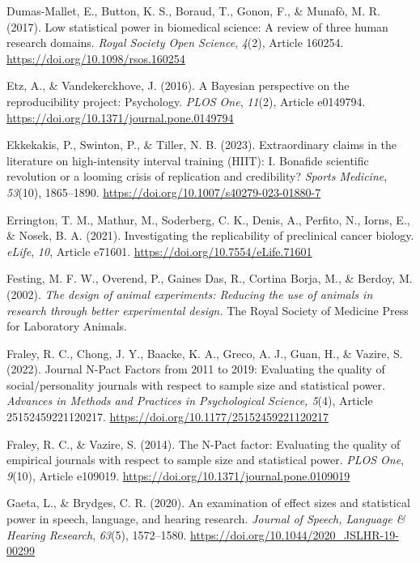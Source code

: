\documentclass[authordate, meta, issue]{jote-new-article}
\begin{document}
	Dumas-Mallet, E., Button, K. S., Boraud, T., Gonon, F., \& Munafò, M. R. (2017). Low statistical power in biomedical science: A review of three human research domains. \emph{Royal Society Open Science}, \emph{4}(2), Article 160254. \url{https://doi.org/10.1098/rsos.160254}



	Etz, A., \& Vandekerckhove, J. (2016). A Bayesian perspective on the reproducibility project: Psychology. \emph{PLOS One}, \emph{11}(2), Article e0149794. \url{https://doi.org/10.1371/journal.pone.0149794}



	Ekkekakis, P., Swinton, P., \& Tiller, N. B. (2023). Extraordinary claims in the literature on high-intensity interval training (HIIT): I. Bonafide scientific revolution or a looming crisis of replication and credibility? \emph{Sports Medicine}, \emph{53}(10), 1865--1890. \url{https://doi.org/10.1007/s40279-023-01880-7}



	Errington, T. M., Mathur, M., Soderberg, C. K., Denis, A., Perfito, N., Iorns, E., \& Nosek, B. A. (2021). Investigating the replicability of preclinical cancer biology. \emph{eLife}, \emph{10}, Article e71601. \url{https://doi.org/10.7554/eLife.71601}



	Festing, M. F. W., Overend, P., Gaines Das, R., Cortina Borja, M., \& Berdoy, M. (2002). \emph{The design of animal experiments: Reducing the use of animals in research through better experimental design.} The Royal Society of Medicine Press for Laboratory Animals.



	Fraley, R. C., Chong, J. Y., Baacke, K. A., Greco, A. J., Guan, H., \& Vazire, S. (2022). Journal N-Pact Factors from 2011 to 2019: Evaluating the quality of social/personality journals with respect to sample size and statistical power. \emph{Advances in Methods and Practices in Psychological Science, 5}(4), Article 25152459221120217. \url{https://doi.org/10.1177/25152459221120217}



	Fraley, R. C., \& Vazire, S. (2014). The N-Pact factor: Evaluating the quality of empirical journals with respect to sample size and statistical power. \emph{PLOS One}, \emph{9}(10), Article e109019. \url{https://doi.org/10.1371/journal.pone.0109019}



	Gaeta, L., \& Brydges, C. R. (2020). An examination of effect sizes and statistical power in speech, language, and hearing research. \emph{Journal of Speech, Language \& Hearing Research}, \emph{63}(5), 1572--1580. \url{https://doi.org/10.1044/2020\_JSLHR-19-00299}
\end{document}

